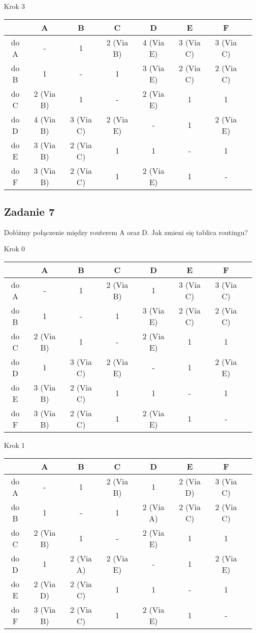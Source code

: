 \documentclass[a4paper]{article}
\begin{document}
\begin{center}
Krok 3\\
\begin{tabular}{|c *{6}{|c} |c|}\hline
 & A & B & C & D & E & F\\
\hline 
do A & - & 1 & 2 (Via B) & 4 (Via E)  & 3 (Via C) &  3 (Via C)\\
\hline 
do B & 1 & - & 1 & 3 (Via E) & 2 (Via C) & 2 (Via C)\\
\hline 
do C & 2 (Via B) & 1 & - & 2 (Via E) & 1 & 1\\
\hline 
do D & 4 (Via B) & 3 (Via C) & 2 (Via E) & - & 1 & 2 (Via E)\\
\hline 
do E & 3 (Via B) & 2 (Via C) & 1 & 1 & - & 1\\
\hline
do F & 3 (Via B) & 2 (Via C) & 1 & 2 (Via E) & 1 & -\\
\hline
\end{tabular}
\end{center}

\clearpage

\subsection*{Zadanie 7}
Dołóżmy połączenie między routerem A oraz D. Jak zmieni się tablica routingu?
\begin{center}
Krok 0\\
\begin{tabular}{|c *{6}{|c} |c|}\hline
 & A & B & C & D & E & F\\
\hline 
do A & - & 1 & 2 (Via B) & 1  & 3 (Via C) &  3 (Via C)\\
\hline 
do B & 1 & - & 1 & 3 (Via E) & 2 (Via C) & 2 (Via C)\\
\hline 
do C & 2 (Via B) & 1 & - & 2 (Via E) & 1 & 1\\
\hline 
do D & 1 & 3 (Via C) & 2 (Via E) & - & 1 & 2 (Via E)\\
\hline 
do E & 3 (Via B) & 2 (Via C) & 1 & 1 & - & 1\\
\hline
do F & 3 (Via B) & 2 (Via C) & 1 & 2 (Via E) & 1 & -\\
\hline
\end{tabular}

Krok 1\\
\begin{tabular}{|c *{6}{|c} |c|}\hline
 & A & B & C & D & E & F\\
\hline 
do A & - & 1 & 2 (Via B) & 1 & 2 (Via D) &  3 (Via C)\\
\hline 
do B & 1 & - & 1 & 2 (Via A) & 2 (Via C) & 2 (Via C)\\
\hline 
do C & 2 (Via B) & 1 & - & 2 (Via E) & 1 & 1\\
\hline 
do D & 1 & 2 (Via A) & 2 (Via E) & - & 1 & 2 (Via E)\\
\hline 
do E & 2 (Via D) & 2 (Via C) & 1 & 1 & - & 1\\
\hline
do F & 3 (Via B) & 2 (Via C) & 1 & 2 (Via E) & 1 & -\\
\hline
\end{tabular}
\end{center}
\end{document}
